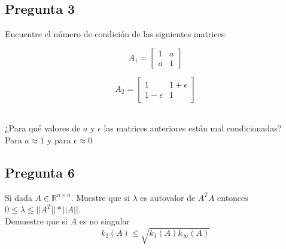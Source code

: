 \documentclass{article}
\begin{document}
\subsection*{Pregunta 3}
Encuentre el número de condición de las siguientes matrices:\\
\begin{figure}[h!]
\begin{minipage}{4cm}
\center
$$
A_1 =  
\begin{bmatrix}
1 & a\\
a & 1
\end{bmatrix}$$
\end{minipage}
\begin{minipage}{4cm}
$$A_2 =
\begin{bmatrix}
1 & 1 + \epsilon\\
1 - \epsilon & 1
\end{bmatrix}$$
\end{minipage}
\end{figure}
\\
¿Para qué valores de $a$ y $\epsilon$ las matrices anteriores están mal condicionadas?\\
Para $a\approx 1$ y para $\epsilon \approx 0$
\subsection*{Pregunta 6}
Si dada $A \in \mathbb{R}^{n\times n}$. Muestre que si $\lambda$ es autovalor de $A^{T}A$ entonces $0\leq \lambda\leq ||A^{T}||* ||A||$.\\
Demuestre que si $A$ es no singular
$$k_2(A) \leq \sqrt{k_1(A)k_\infty(A)} $$
\end{document}
